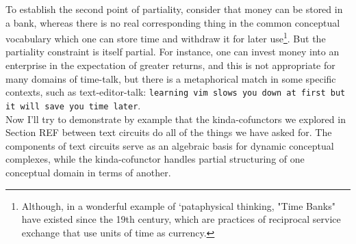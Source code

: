 To establish the second point of partiality, consider that money can be stored in a bank, whereas there is no real corresponding thing in the common conceptual vocabulary which one can store time and withdraw it for later use\footnote{Although, in a wonderful example of `pataphysical thinking, "Time Banks" have existed since the 19th century, which are practices of reciprocal service exchange that use units of time as currency.}. But the partiality constraint is itself partial. For instance, one can invest money into an enterprise in the expectation of greater returns, and this is not appropriate for many domains of time-talk, but there is a metaphorical match in some specific contexts, such as text-editor-talk: \texttt{learning vim slows you down at first but it will save you time later}.\\

Now I'll try to demonstrate by example that the kinda-cofunctors we explored in Section \bR REF \e between text circuits do all of the things we have asked for. The components of text circuits serve as an algebraic basis for dynamic conceptual complexes, while the kinda-cofunctor handles partial structuring of one conceptual domain in terms of another.

